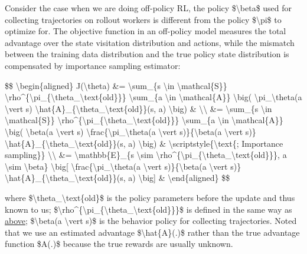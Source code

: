 Consider the case when we are doing off-policy RL, the policy \$\textbackslash beta\$ used for collecting trajectories on rollout workers is different from the policy \$\textbackslash pi\$ to optimize for. The objective function in an off-policy model measures the total advantage over the state visitation distribution and actions, while the mismatch between the training data distribution and the true policy state distribution is compensated by importance sampling estimator:

\$\$ \textbackslash begin\{aligned\} J(\textbackslash theta) \&= \textbackslash sum\_\{s \textbackslash in \textbackslash mathcal\{S\}\} \textbackslash rho\^{}\{\textbackslash pi\_\{\textbackslash theta\_\textbackslash text\{old\}\}\} \textbackslash sum\_\{a \textbackslash in \textbackslash mathcal\{A\}\} \textbackslash big( \textbackslash pi\_\textbackslash theta(a \textbackslash vert s) \textbackslash hat\{A\}\_\{\textbackslash theta\_\textbackslash text\{old\}\}(s, a) \textbackslash big) \& \textbackslash\textbackslash{} \&= \textbackslash sum\_\{s \textbackslash in \textbackslash mathcal\{S\}\} \textbackslash rho\^{}\{\textbackslash pi\_\{\textbackslash theta\_\textbackslash text\{old\}\}\} \textbackslash sum\_\{a \textbackslash in \textbackslash mathcal\{A\}\} \textbackslash big( \textbackslash beta(a \textbackslash vert s) \textbackslash frac\{\textbackslash pi\_\textbackslash theta(a \textbackslash vert s)\}\{\textbackslash beta(a \textbackslash vert s)\} \textbackslash hat\{A\}\_\{\textbackslash theta\_\textbackslash text\{old\}\}(s, a) \textbackslash big) \& \textbackslash scriptstyle\{\textbackslash text\{; Importance sampling\}\} \textbackslash\textbackslash{} \&= \textbackslash mathbb\{E\}\_\{s \textbackslash sim \textbackslash rho\^{}\{\textbackslash pi\_\{\textbackslash theta\_\textbackslash text\{old\}\}\}, a \textbackslash sim \textbackslash beta\} \textbackslash big{[} \textbackslash frac\{\textbackslash pi\_\textbackslash theta(a \textbackslash vert s)\}\{\textbackslash beta(a \textbackslash vert s)\} \textbackslash hat\{A\}\_\{\textbackslash theta\_\textbackslash text\{old\}\}(s, a) \textbackslash big{]} \& \textbackslash end\{aligned\} \$\$

where \$\textbackslash theta\_\textbackslash text\{old\}\$ is the policy parameters before the update and thus known to us; \$\textbackslash rho\^{}\{\textbackslash pi\_\{\textbackslash theta\_\textbackslash text\{old\}\}\}\$ is defined in the same way as \hyperref[dpg]{above}; \$\textbackslash beta(a \textbackslash vert s)\$ is the behavior policy for collecting trajectories. Noted that we use an estimated advantage \$\textbackslash hat\{A\}(.)\$ rather than the true advantage function \$A(.)\$ because the true rewards are usually unknown.

